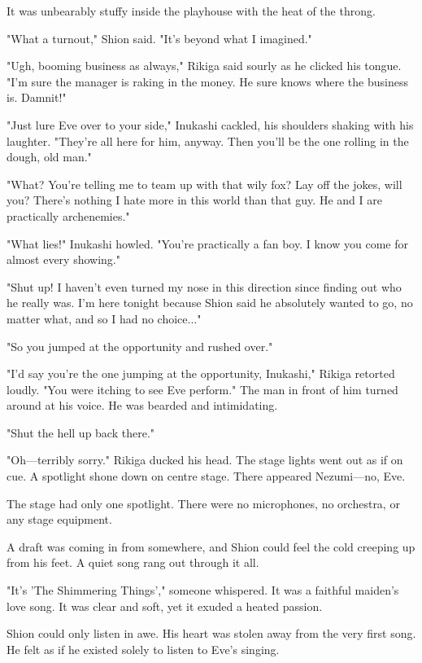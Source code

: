 \myspace

It was unbearably stuffy inside the playhouse with the heat of the throng.

"What a turnout," Shion said. "It's beyond what I imagined."

"Ugh, booming business as always," Rikiga said sourly as he clicked his tongue. "I'm sure the manager is raking in the money. He sure knows where the business is. Damnit!"

"Just lure Eve over to your side," Inukashi cackled, his shoulders shaking with his laughter. "They're all here for him, anyway. Then you'll be the one rolling in the dough, old man."

"What? You're telling me to team up with that wily fox? Lay off the jokes, will you? There's nothing I hate more in this world than that guy. He and I are practically archenemies."

"What lies!" Inukashi howled. "You're practically a fan boy. I know you come for almost every showing."

"Shut up! I haven't even turned my nose in this direction since finding out who he really was. I'm here tonight because Shion said he absolutely wanted to go, no matter what, and so I had no choice..."

"So you jumped at the opportunity and rushed over."

"I'd say you're the one jumping at the opportunity, Inukashi," Rikiga retorted loudly. "You were itching to see Eve perform." The man in front of him turned around at his voice. He was bearded and intimidating.

"Shut the hell up back there."

"Oh---terribly sorry." Rikiga ducked his head. The stage lights went out as if on cue. A spotlight shone down on centre stage. There appeared Nezumi---no, Eve.

The stage had only one spotlight. There were no microphones, no orchestra, or any stage equipment.

A draft was coming in from somewhere, and Shion could feel the cold creeping up from his feet. A quiet song rang out through it all.

"It's 'The Shimmering Things'," someone whispered. It was a faithful maiden's love song. It was clear and soft, yet it exuded a heated passion.

Shion could only listen in awe. His heart was stolen away from the very first song. He felt as if he existed solely to listen to Eve's singing.

